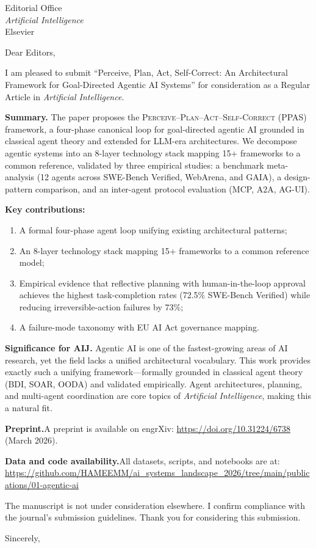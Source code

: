 \documentclass[10pt]{letter}
\date{April 15, 2026}
\begin{document}
\begin{letter}{Editorial Office\\
\emph{Artificial Intelligence}\\
Elsevier}

\opening{Dear Editors,}

I am pleased to submit ``Perceive, Plan, Act, Self-Correct: An Architectural Framework for Goal-Directed Agentic AI Systems'' for consideration as a Regular Article in \emph{Artificial Intelligence}.

\textbf{Summary.}\quad
The paper proposes the \textsc{Perceive--Plan--Act--Self-Correct} (PPAS) framework, a four-phase canonical loop for goal-directed agentic AI grounded in classical agent theory and extended for LLM-era architectures. We decompose agentic systems into an 8-layer technology stack mapping 15+ frameworks to a common reference, validated by three empirical studies: a benchmark meta-analysis (12 agents across SWE-Bench Verified, WebArena, and GAIA), a design-pattern comparison, and an inter-agent protocol evaluation (MCP, A2A, AG-UI).

\textbf{Key contributions:}
\begin{enumerate}[nosep, leftmargin=1.5em]
    \item A formal four-phase agent loop unifying existing architectural patterns;
    \item An 8-layer technology stack mapping 15+ frameworks to a common reference model;
    \item Empirical evidence that reflective planning with human-in-the-loop approval achieves the highest task-completion rates (72.5\% SWE-Bench Verified) while reducing irreversible-action failures by 73\%;
    \item A failure-mode taxonomy with EU AI Act governance mapping.
\end{enumerate}

\textbf{Significance for AIJ.}\quad
Agentic AI is one of the fastest-growing areas of AI research, yet the field lacks a unified architectural vocabulary. This work provides exactly such a unifying framework---formally grounded in classical agent theory (BDI, SOAR, OODA) and validated empirically. Agent architectures, planning, and multi-agent coordination are core topics of \emph{Artificial Intelligence}, making this a natural fit.

\textbf{Preprint.}\quad A preprint is available on engrXiv: \url{https://doi.org/10.31224/6738} (March 2026).

\textbf{Data and code availability.}\quad All datasets, scripts, and notebooks are at: \url{https://github.com/HAMEEMM/ai_systems_landscape_2026/tree/main/publications/01-agentic-ai}

The manuscript is not under consideration elsewhere. I confirm compliance with the journal's submission guidelines. Thank you for considering this submission.

\closing{Sincerely,}

\end{letter}
\end{document}
